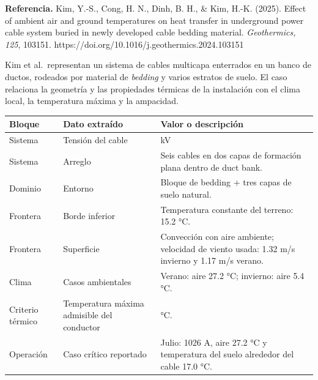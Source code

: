 \documentclass[11pt,a4paper,oneside]{report}
\newcounter{none}
\begin{document}
\textbf{Referencia.} Kim, Y.-S., Cong, H. N., Dinh, B. H., \& Kim, H.-K.
(2025). Effect of ambient air and ground temperatures on heat transfer
in underground power cable system buried in newly developed cable
bedding material. \emph{Geothermics, 125}, 103151.
https://doi.org/10.1016/j.geothermics.2024.103151

Kim et al.~representan un sistema de cables multicapa enterrados en un
banco de ductos, rodeados por material de \textit{bedding} y varios
estratos de suelo. El caso relaciona la geometría y las propiedades
térmicas de la instalación con el clima local, la temperatura máxima y
la ampacidad.

{\def\LTcaptype{none} %
\begin{longtable}[]{@{}
  >{\raggedright\arraybackslash}p{}
  >{\raggedright\arraybackslash}p{}
  >{\raggedright\arraybackslash}p{}@{}}
\toprule\noalign{}
\begin{minipage}[b]{\linewidth}\raggedright
Bloque
\end{minipage} & \begin{minipage}[b]{\linewidth}\raggedright
Dato extraído
\end{minipage} & \begin{minipage}[b]{\linewidth}\raggedright
Valor o descripción
\end{minipage} \\
\midrule\noalign{}
\endhead
\bottomrule\noalign{}
\endlastfoot
Sistema & Tensión del cable & 154 kV \\
Sistema & Arreglo & Seis cables en dos capas de formación plana dentro
de duct bank. \\
Dominio & Entorno & Bloque de bedding + tres capas de suelo natural. \\
Frontera & Borde inferior & Temperatura constante del terreno: 15.2
°C. \\
Frontera & Superficie & Convección con aire ambiente; velocidad de
viento usada: 1.32 m/s invierno y 1.17 m/s verano. \\
Clima & Casos ambientales & Verano: aire 27.2 °C; invierno: aire 5.4
°C. \\
Criterio térmico & Temperatura máxima admisible del conductor & 90
°C. \\
Operación & Caso crítico reportado & Julio: 1026 A, aire 27.2 °C y
temperatura del suelo alrededor del cable 17.0 °C. \\
\end{longtable}
}
\end{document}
